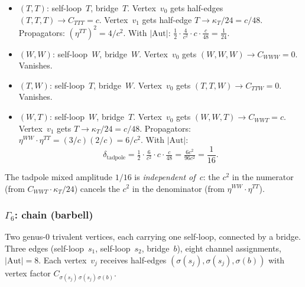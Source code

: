 \documentclass[11pt]{article}
\theoremstyle{plain}
\theoremstyle{definition}
\theoremstyle{remark}
\begin{document}
\begin{itemize}
\item \emph{$(T,T)$}: self-loop~$T$, bridge~$T$. Vertex~$v_0$ gets
 half-edges $(T,T,T) \to C_{TTT} = c$. Vertex~$v_1$ gets
 half-edge $T \to \kappa_T/24 = c/48$. Propagators:
 $(\eta^{TT})^2 = 4/c^2$. With $|\mathrm{Aut}|$:
 $\frac{1}{2} \cdot \frac{4}{c^2} \cdot c \cdot \frac{c}{48}
 = \frac{1}{24}$.

\item \emph{$(W,W)$}: self-loop~$W$, bridge~$W$. Vertex~$v_0$ gets
 $(W,W,W) \to C_{WWW} = 0$. Vanishes.

\item \emph{$(T,W)$}: self-loop~$T$, bridge~$W$. Vertex~$v_0$ gets
 $(T,T,W) \to C_{TTW} = 0$. Vanishes.

\item \emph{$(W,T)$}: self-loop~$W$, bridge~$T$. Vertex~$v_0$ gets
 $(W,W,T) \to C_{WWT} = c$. Vertex~$v_1$ gets
 $T \to \kappa_T/24 = c/48$. Propagators:
 $\eta^{WW} \cdot \eta^{TT} = (3/c)(2/c) = 6/c^2$.
 With $|\mathrm{Aut}|$:
 \begin{equation}\label{eq:tadpole-mixed}
 \delta_{\mathrm{tadpole}}
 = \tfrac{1}{2} \cdot \tfrac{6}{c^2} \cdot c \cdot \tfrac{c}{48}
 = \tfrac{6c^2}{96c^2} = \frac{1}{16}.
 \end{equation}
\end{itemize}
The tadpole mixed amplitude $1/16$ is \emph{independent of~$c$}:
the $c^2$ in the numerator (from $C_{WWT} \cdot \kappa_T/24$)
cancels the $c^2$ in the denominator (from $\eta^{WW} \cdot \eta^{TT}$).


\subsubsection*{$\Gamma_6$: chain (barbell)}

Two genus-$0$ trivalent vertices, each carrying one self-loop,
connected by a bridge. Three edges
(self-loop~$s_1$, self-loop~$s_2$, bridge~$b$),
eight channel assignments, $|\mathrm{Aut}| = 8$.
Each vertex~$v_j$ receives half-edges
$(\sigma(s_j), \sigma(s_j), \sigma(b))$
with vertex factor $C_{\sigma(s_j)\,\sigma(s_j)\,\sigma(b)}$.
\end{document}
